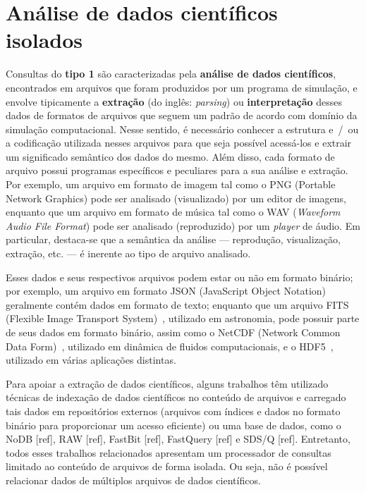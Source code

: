 \section{Análise de dados científicos isolados}%
\label{sec:analise-de-dados-cientificos-isolados}

Consultas do \textbf{tipo 1} são caracterizadas pela \textbf{análise de dados científicos}, encontrados em arquivos que foram produzidos por um programa de simulação, e envolve tipicamente a \textbf{extração} (do inglês: \textit{parsing}) ou \textbf{interpretação} desses dados de formatos de arquivos que seguem um padrão de acordo com domínio da simulação computacional. Nesse sentido, é necessário conhecer a estrutura e~/~ou a codificação utilizada nesses arquivos para que seja possível acessá-los e extrair um significado semântico dos dados do mesmo. Além disso, cada formato de arquivo possui programas específicos e peculiares para a sua análise e extração. Por exemplo, um arquivo em formato de imagem tal como o  PNG (Portable Network Graphics) pode ser analisado (visualizado) por um editor de imagens, enquanto que um arquivo em formato de música tal como o  WAV (\textit{Waveform Audio File Format}) pode ser analisado (reproduzido) por um \textit{player} de áudio. Em particular, destaca-se que a semântica da análise --- reprodução, visualização, extração, etc. --- é inerente ao tipo de arquivo analisado.

Esses dados e seus respectivos arquivos podem estar ou não em formato binário; por exemplo, um arquivo em formato  JSON (JavaScript Object Notation) geralmente contém dados em formato de texto; enquanto que um arquivo FITS (Flexible Image Transport System)~\cite{greisen2002representations}, utilizado em astronomia, pode possuir parte de seus dados em formato binário, assim como o NetCDF (Network Common Data Form)~\cite{rew1990netcdf}, utilizado em dinâmica de fluidos computacionais, e o HDF5~\cite{folk1999hdf5}, utilizado em várias aplicações distintas.

Para apoiar a extração de dados científicos, alguns trabalhos têm utilizado técnicas de indexação de dados científicos no conteúdo de arquivos e carregado tais dados em repositórios externos (arquivos com índices e dados no formato binário para proporcionar um acesso eficiente) ou uma base de dados, como o NoDB [ref], RAW [ref], FastBit [ref], FastQuery [ref] e SDS/Q [ref]. Entretanto, todos esses trabalhos relacionados apresentam um processador de consultas limitado ao conteúdo de arquivos de forma isolada. Ou seja, não é possível relacionar dados de múltiplos arquivos de dados científicos.

